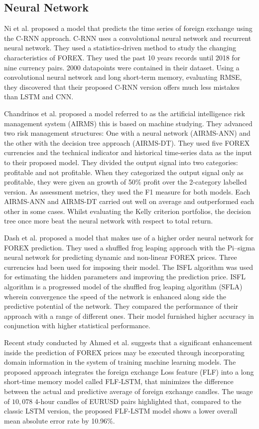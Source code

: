 \subsection{Neural Network}
Ni et al. \cite{Ni19} proposed a model that predicts the time series of foreign exchange using the C-RNN approach. C-RNN uses a convolutional neural network and recurrent neural network. They used a statistics-driven method to study the changing characteristics of FOREX. They used the past 10 years records until 2018 for nine currency pairs. 2000 datapoints were contained in their dataset. Using a convolutional neural network and long short-term memory, evaluating RMSE, they discovered that their proposed C-RNN version offers much less mistakes than LSTM and CNN.

Chandrinos et al. \cite{Chandrinos18} proposed a model referred to as the artificial intelligence risk management system (AIRMS) this is based on machine studying. They advanced two risk management structures: One with a neural network (AIRMS-ANN) and the other with the decision tree approach (AIRMS-DT). They used five FOREX currencies and the technical indicator and historical time-series data as the input to their proposed model. They divided the output signal into two categories: profitable and not profitable. When they categorized the output signal only as profitable, they were given an growth of 50\% profit over the 2-category labelled version. As assessment metrics, they used the F1 measure for both models. Each AIRMS-ANN and AIRMS-DT carried out well on average and outperformed each other in some cases. Whilst evaluating the Kelly criterion portfolios, the decision tree once more beat the neural network with respect to total return.

Dash et al. \cite{Dash18} proposed a model that makes use of a higher order neural network for FOREX prediction. They used a shuffled frog leaping approach with the Pi–sigma neural network for predicting dynamic and non-linear FOREX prices. Three currencies had been used for imposing their model. The ISFL algorithm was used for estimating the hidden parameters and improving the prediction price. ISFL algorithm is a progressed model of the shuffled frog leaping algorithm (SFLA) wherein convergence the speed of the network is enhanced along side the predictive potential of the network. They compared the performance of their approach with a range of different ones. Their model furnished higher accuracy in conjunction with higher statistical performance.

Recent study conducted by Ahmed et al. \cite{Ahmed20} suggests that a significant enhancement inside the prediction of FOREX prices may be executed through incorporating domain information in the system of training machine learning models. The proposed approach integrates the foreign exchange Loss feature (FLF) into a long short-time memory model called FLF-LSTM, that minimizes the difference between the actual and predictive average of foreign exchange candles. The usage of $10,078$ 4-hour candles of EURUSD pairs highlighted that, compared to the classic LSTM version, the proposed FLF-LSTM model shows a lower overall mean absolute error rate by 10.96\%.

